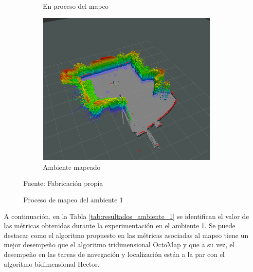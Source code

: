 \begin{figure}[H]
\begin{subfigure}[b]{0.30\textwidth}
    \caption{En proceso del mapeo}
    \label{fig:ambiente_1_2}
    \end{subfigure}
    \begin{subfigure}[b]{0.30\textwidth}
    \includegraphics[width=\textwidth, height=\textwidth]{figures/05experimentacion/ambiente_1/r00_03.png}
    \caption{Ambiente mapeado}
    \label{fig:ambiente_1_3}
    \end{subfigure}
    \caption{Proceso de mapeo del ambiente 1}
    Fuente: Fabricación propia
    \label{fig:ambiente_1}
\end{figure} 

A continuación, en la Tabla \ref{tab:resultados_ambiente_1} se identifican el valor de las métricas obtenidas durante la experimentación en el ambiente 1. Se puede destacar como el algoritmo propuesto en las métricas asociadas al mapeo tiene un mejor desempeño que el algoritmo tridimensional OctoMap y que a su vez, el desempeño en las tareas de navegación y localización están a la par con el algoritmo bidimensional Hector. 


